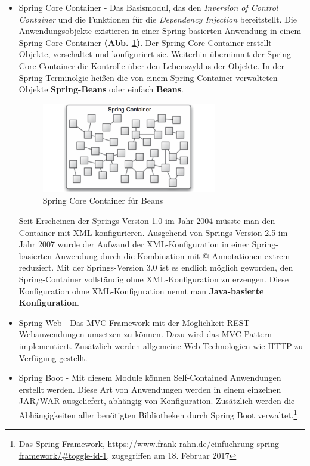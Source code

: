 \begin{itemize}
	\item Spring Core Container - Das Basismodul, das den \textit{Inversion of Control Container} und die Funktionen für die \textit{Dependency Injection} bereitstellt. Die Anwendungsobjekte existieren in einer Spring-basierten Anwendung in einem Spring Core Container \textbf{(Abb. \ref{img:container})}. Der Spring Core Container erstellt Objekte, verschaltet und konfiguriert sie. Weiterhin übernimmt der Spring Core Container die Kontrolle über den Lebenszyklus der Objekte. In der Spring Terminolgie heißen die von einem Spring-Container verwalteten Objekte \textbf{Spring-Beans} oder einfach \textbf{Beans}.

\begin{figure}[H]
\centering
\includegraphics[width=3.0in]{resources/container}
\caption[Spring Core Container für Beans]{Spring Core Container für Beans}
\label{img:container}
\end{figure}

Seit Erscheinen der Springs-Version 1.0 im Jahr 2004 müsste man den Container mit XML konfigurieren. Ausgehend von Springs-Version 2.5 im Jahr 2007 wurde der Aufwand der XML-Konfiguration in einer Spring-basierten Anwendung durch die Kombination mit @-Annotationen extrem reduziert. Mit der Springs-Version 3.0 ist es endlich möglich geworden, den Spring-Container vollständig ohne XML-Konfiguration zu erzeugen. Diese Konfiguration ohne XML-Konfiguration nennt man \textbf{Java-basierte Konfiguration}.

	\item Spring Web - Das MVC-Framework mit der Möglichkeit REST-Webanwendungen umsetzen zu können. Dazu wird das MVC-Pattern implementiert. Zusätzlich werden allgemeine Web-Technologien wie HTTP zu Verfügung gestellt.
	\item Spring Boot - Mit diesem Module können Self-Contained Anwendungen erstellt werden. Diese Art von Anwendungen werden in einem einzelnen JAR/WAR ausgeliefert, abhängig von Konfiguration. Zusätzlich werden die Abhängigkeiten aller benötigten Bibliotheken durch Spring Boot verwaltet.\footnote{Das Spring Framework, \url{https://www.frank-rahn.de/einfuehrung-spring-framework/\#toggle-id-1}, zugegriffen am 18. Februar 2017}
	\end{itemize}

